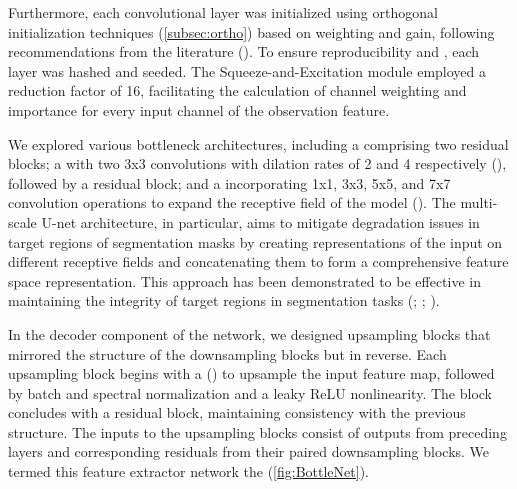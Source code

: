 \bigskip

\noindent Furthermore, each convolutional layer was initialized using orthogonal initialization techniques (\autoref{subsec:ortho}) based on weighting and gain, following recommendations from the literature (\cite{shengyi2022the37implementation}). To ensure reproducibility and , each layer was hashed and seeded. The Squeeze-and-Excitation module employed a reduction factor of 16, facilitating the calculation of channel weighting and importance for every input channel of the observation feature.

\bigskip

\noindent We explored various bottleneck architectures, including a  comprising two residual blocks; a  with two 3x3 convolutions with dilation rates of 2 and 4 respectively (\cite{li2018detnet}), followed by a residual block; and a  incorporating 1x1, 3x3, 5x5, and 7x7 convolution operations to expand the receptive field of the model (\cite{Gao_2021}). The multi-scale U-net architecture, in particular, aims to mitigate degradation issues in target regions of segmentation masks by creating representations of the input on different receptive fields and concatenating them to form a comprehensive feature space representation. This approach has been demonstrated to be effective in maintaining the integrity of target regions in segmentation tasks (\cite{article_bot}; \cite{zhu2024efficient}; \cite{bhojanapalli2020lowrank}). 

\bigskip

\noindent In the decoder component of the network, we designed upsampling blocks that mirrored the structure of the downsampling blocks but in reverse. Each upsampling block begins with a  (\cite{shelhamer2016fully}) to upsample the input feature map, followed by batch and spectral normalization and a leaky ReLU nonlinearity. The block concludes with a residual block, maintaining consistency with the previous structure. The inputs to the upsampling blocks consist of outputs from preceding layers and corresponding residuals from their paired downsampling blocks. We termed this feature extractor network the  (\autoref{fig:BottleNet}).

